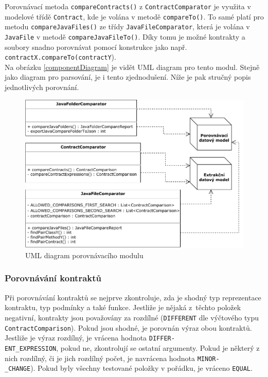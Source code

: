 	    	Porovnávací metoda \texttt{compareContracts()} z \texttt{ContractComparator} je využita v modelové třídě \texttt{Contract}, kde je volána v metodě \texttt{compareTo()}. To samé platí pro metodu \texttt{compareJavaFiles()} ze třídy \texttt{JavaFileComparator}, která je volána v \texttt{JavaFile} v metodě \texttt{compareJavaFileTo()}. Díky tomu je možné kontrakty a soubory snadno porovnávat pomocí konstrukce jako např. \texttt{contractX.compareTo(contractY}).\\
	    	
			Na obrázku \ref{componentDiagram} je vidět UML diagram pro tento modul. Stejně jako diagram pro parsování, je i tento zjednodušení. Níže je pak stručný popis jednotlivých porovnání.    	
	    	
	    	\begin{figure}[!htb]
					\centering
					\includegraphics[width=1\textwidth]{img/comparatorUMLdiagram.pdf}
					\caption[comparatorUMLdiagram]{UML diagram porovnávacího modulu}
					\label{comparatorUMLdiagram}
				\endminipage\hfill
			\end{figure}
	    
	    
	    
	    \subsubsection{Porovnávání kontraktů}
	    	Při porovnávání kontraktů se nejprve zkontroluje, zda je shodný typ reprezentace kontraktu, typ podmínky a také funkce. Jestliže je nějaká z~těchto položek negativní, kontrakty jsou považovány za rozdílné (\texttt{DIFFERENT} dle výčtového typu \texttt{ContractComparison}). Pokud jsou shodné, je porovnán výraz obou kontraktů. Jestliže je výraz rozdílný, je vrácena hodnota \texttt{DIFFER-}\\\texttt{ENT\_EXPRESSION}, pokud ne, zkontrolují se ostatní argumenty. Pokud je některý z nich rozdílný, či je jich rozdílný počet, je navrácena hodnota \texttt{MINOR-}\\\texttt{\_CHANGE}). Pokud byly všechny testované položky v pořádku, je vráceno \texttt{EQUAL}.\\
	    	
